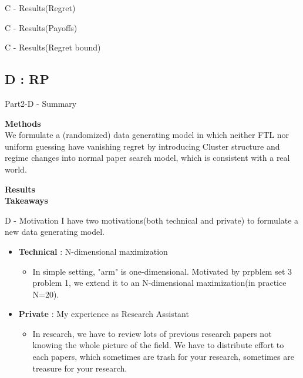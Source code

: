 \documentclass{beamer}
\begin{document}
\begin{frame}{C - Results(Regret)}

    
\end{frame}


\begin{frame}{C - Results(Payoffs)}

    
\end{frame}

\begin{frame}{C - Results(Regret bound)}

    
\end{frame}



\subsection{D : RP}

\begin{frame}{Part2-D - Summary}

\textbf{Methods}\\
We formulate a (randomized) data generating model in which neither FTL nor uniform guessing have vanishing regret by introducing Cluster structure and regime changes into normal paper search model, which is consistent with a real world.

\vspace{1em}
\textbf{Results}\\



\vspace{1em}
\textbf{Takeaways}\\


\end{frame}

\begin{frame}{D - Motivation}
I have two motivations(both technical and private) to formulate a new data generating model.
    \begin{itemize}
        \item \textbf{Technical} : N-dimensional maximization
        \begin{itemize}
            \item In simple setting, "arm" is one-dimensional. Motivated by prpblem set 3 problem 1, we extend it to an N-dimensional maximization(in practice N=20).
        \end{itemize}
        \item \textbf{Private} : My experience as Research Assistant
        \begin{itemize}
            \item In research, we have to review lots of previous research papers not knowing the whole picture of the field. We have to distribute effort to each papers, which sometimes are trash for your research, sometimes are treasure for your research.
        \end{itemize}
    \end{itemize}
\end{frame}
\end{document}

